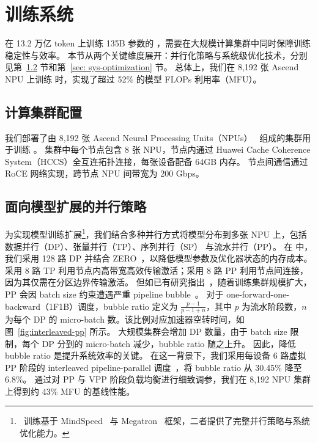 \section{训练系统}
在 13.2 万亿 token 上训练 135B 参数的 \modelname，需要在大规模计算集群中同时保障训练稳定性与效率。
本节从两个关键维度展开：并行化策略与系统级优化技术，分别见第~\ref{sec: parallelism} 节和第~\ref{sec: sys-optimization} 节。
总体上，我们在 8,192 张 Ascend NPU 上训练 \modelname{} 时，实现了超过 52\% 的模型 FLOPs 利用率（MFU）。



\subsection{计算集群配置}
我们部署了由 8,192 张 Ascend Neural Processing Units（NPUs）~\cite{910b2, 910b2-technical} 组成的集群用于训练 \modelname。
集群中每个节点包含 8 张 NPU，节点内通过 Huawei Cache Coherence System（HCCS）全互连拓扑连接，每张设备配备 64GB 内存。
节点间通信通过 RoCE 网络实现，跨节点 NPU 间带宽为 200 Gbps。

\subsection{面向模型扩展的并行策略}  \label{sec: parallelism}
为实现模型训练扩展\footnote{\modelname~训练基于 MindSpeed~\cite{mindspeed} 与 Megatron~\cite{megatron-github, megatron-lm} 框架，二者提供了完整并行策略与系统优化能力。}，我们结合多种并行方式将模型分布到多张 NPU 上，包括数据并行（DP）\cite{data_parallel}、张量并行（TP）\cite{megatron-lm}、序列并行（SP）\cite{megatron-sp} 与流水并行（PP）\cite{gpipe, pipedream}。
在 \modelname 中，我们采用 128 路 DP 并结合 ZERO~\cite{zero}，以降低模型参数及优化器状态的内存成本。
采用 8 路 TP 利用节点内高带宽高效传输激活；采用 8 路 PP 利用节点间连接，因为其仅需在分区边界传输激活。
但如已有研究指出~\cite{megascale, gpipe, pipedream, zero_pp}，随着训练集群规模扩大，PP 会因 batch size 约束遭遇严重 pipeline bubble~\cite{megascale}。
对于 one-forward-one-backward（1F1B）调度，bubble ratio 定义为 $\frac{p-1}{p-1+n}$，其中 $p$ 为流水阶段数，$n$ 为每个 DP 的 micro-batch 数。该比例对应加速器空转时间，如图~\ref{fig:interleaved-pp} 所示。
大规模集群会增加 DP 数量，由于 batch size 限制，每个 DP 分到的 micro-batch 减少，bubble ratio 随之上升。
因此，降低 bubble ratio 是提升系统效率的关键。
在这一背景下，我们采用每设备 6 路虚拟 PP 阶段的 interleaved pipeline-parallel 调度~\cite{interleaved-pp}，将 bubble ratio 从 30.45\% 降至 6.8\%。
通过对 PP 与 VPP 阶段负载均衡进行细致调参，我们在 8,192 NPU 集群上得到约 43\% MFU 的基线性能。

